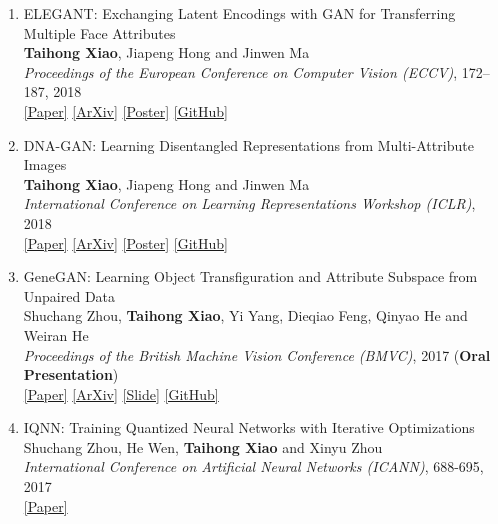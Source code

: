 \documentclass[letterpaper]{article}
\begin{document}
\begin{enumerate}

\item ELEGANT: Exchanging Latent Encodings with GAN for Transferring Multiple Face Attributes\\
	{\bf Taihong Xiao}, Jiapeng Hong and Jinwen Ma\\
	{\it Proceedings of the European Conference on Computer Vision (ECCV)}, 172--187, 2018\\
	\href{http://openaccess.thecvf.com/content_ECCV_2018/papers/Taihong_Xiao_ELEGANT_Exchanging_Latent_ECCV_2018_paper.pdf}{[Paper]}
	\href{https://arxiv.org/abs/1803.10562}{[ArXiv]}
	\href{https://prinsphield.github.io/ECCV-2018/poster/poster.pdf}{[Poster]}
	\href{https://github.com/Prinsphield/ELEGANT}{[GitHub]}
	
\item DNA-GAN: Learning Disentangled Representations from Multi-Attribute Images\\
	{\bf Taihong Xiao}, Jiapeng Hong and Jinwen Ma\\
	{\it International Conference on Learning Representations Workshop (ICLR)}, 2018\\
	\href{https://openreview.net/pdf?id=rkX1FF_UM}{[Paper]} 
	\href{https://arxiv.org/abs/1711.05415v2}{[ArXiv]}
	\href{https://prinsphield.github.io/ICLR-2018/poster/poster.pdf}{[Poster]}
	\href{https://github.com/Prinsphield/DNA-GAN}{[GitHub]}
	
\item GeneGAN: Learning Object Transfiguration and Attribute Subspace from Unpaired Data\\
	Shuchang Zhou, {\bf Taihong Xiao}, Yi Yang, Dieqiao Feng, Qinyao He and Weiran He\\
	{\it Proceedings of the British Machine Vision Conference (BMVC)}, 2017 ({\bf Oral Presentation})\\
	\href{https://www.dropbox.com/s/3qofizvcfi4pa0f/0520.pdf?dl=1}{[Paper]}
	\href{http://arxiv.org/abs/1705.04932}{[ArXiv]}
	\href{http://zsc.github.io/GeneGAN-BMVC2017.pdf}{[Slide]}
	\href{https://github.com/Prinsphield/GeneGAN}{[GitHub]}

\item IQNN: Training Quantized Neural Networks with Iterative Optimizations\\
	Shuchang Zhou, He Wen, {\bf Taihong Xiao} and Xinyu Zhou\\
	{\it International Conference on Artificial Neural Networks (ICANN)},  688-695, 2017\\
	\href{https://link.springer.com/chapter/10.1007\%2F978-3-319-68612-7_78}{[Paper]} 


\end{enumerate}
\end{document}
